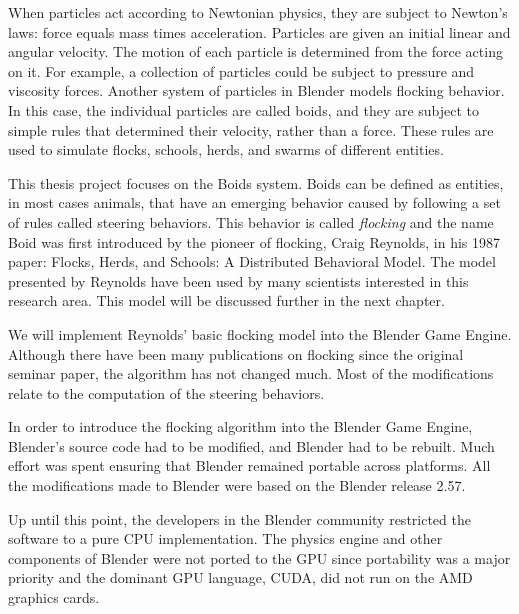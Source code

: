 

When particles act according to Newtonian physics, they are subject to Newton's laws: force equals mass times acceleration. Particles are given an initial linear and angular velocity. The motion of each particle is determined from the force acting on it. For example, a collection of particles could be subject to pressure and viscosity forces. Another system of particles in Blender models flocking behavior. In this case, the individual particles are called boids, and they are subject to simple rules that determined their velocity, rather than a force. These rules are used to simulate flocks, schools, herds, and swarms of different entities.

This thesis project focuses on the Boids system. Boids can be defined as entities, in most cases animals, that have an emerging behavior caused by following a set of rules called steering behaviors. This behavior is called \textit{flocking} and the name Boid was first introduced by the pioneer of flocking, Craig Reynolds, in his 1987 paper: Flocks, Herds, and Schools: A Distributed Behavioral Model\cite{craig1}. The model presented by Reynolds have been used by many scientists interested in this research area. This model will be discussed further in the next chapter.

We will implement Reynolds' basic flocking model into the Blender Game Engine. Although there have been many publications on flocking since the original seminar paper, the algorithm has not changed much. Most of the modifications relate to the computation of the steering behaviors.

In order to introduce the flocking algorithm into the Blender Game Engine, Blender's source code had to be  modified, and Blender had to be rebuilt. Much effort was spent ensuring that Blender remained portable across platforms. All the modifications made to Blender were based on the Blender release 2.57. 



Up until this point, the developers in the Blender community restricted the software to a pure CPU implementation. The physics engine and other components of Blender were not ported to the GPU since portability was a major priority  and the dominant GPU language, CUDA, did not run on the AMD graphics cards.


